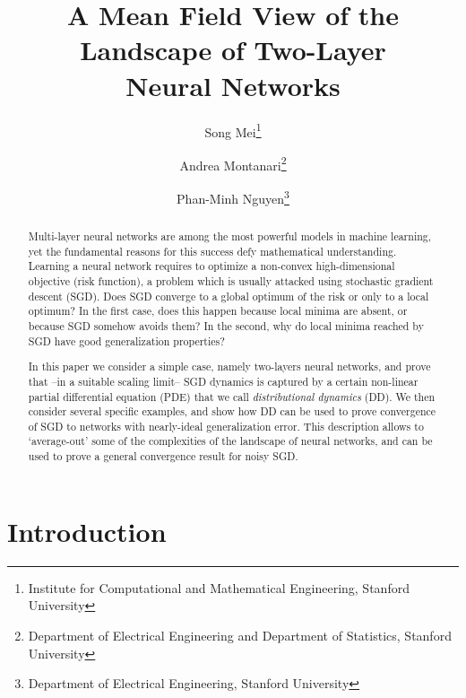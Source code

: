 \documentclass[11pt]{article}
\begin{document}
\title{A Mean Field View of the Landscape of Two-Layer \\Neural Networks}

\author{Song Mei\thanks{Institute for Computational and Mathematical Engineering, Stanford University}\and  Andrea Montanari\thanks{Department of Electrical Engineering and
  Department of Statistics,    Stanford University}
\and Phan-Minh Nguyen\thanks{Department of Electrical Engineering,    Stanford University}}


\maketitle


\begin{abstract}
Multi-layer neural networks are among the most powerful models in machine learning,
yet the fundamental reasons for this success defy mathematical understanding.
Learning a neural network requires to optimize a  non-convex  high-dimensional 
objective (risk function), a problem which is usually attacked using stochastic gradient descent (SGD). 
Does SGD converge to a global optimum of the risk or only to a local optimum? In the first case,
does this happen because local minima are absent, or because SGD somehow avoids them? In the
second, why do local minima reached by SGD have good generalization properties?

In this paper we consider a simple case, namely  two-layers neural networks,
and prove that --in a suitable scaling limit--  SGD dynamics is captured by a certain non-linear 
partial differential equation (PDE) that we call \emph{distributional
  dynamics} (DD). We then consider several specific examples, and show
how  DD can be used to prove convergence of SGD to networks with 
nearly-ideal  generalization error. This description allows to `average-out' some of the complexities
of the landscape of neural networks, and can be used to prove a general convergence result for noisy SGD.
\end{abstract}

{
\hypersetup{linkcolor=black}
  \tableofcontents
}

\section{Introduction}
\end{document}
